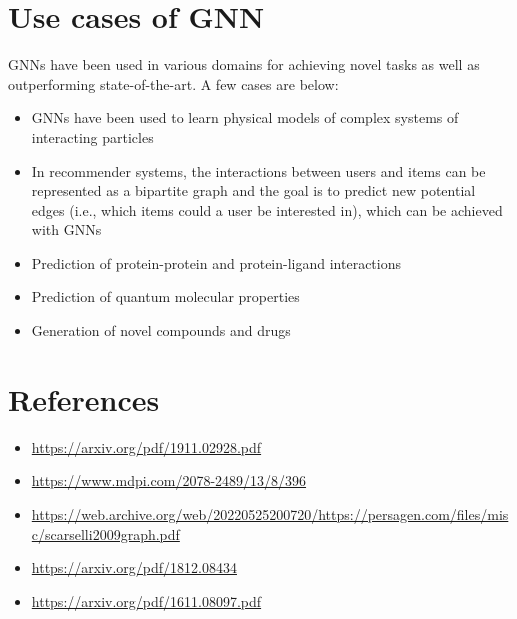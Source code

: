 \documentclass[
]{article}
\providecommand{\tightlist}{%
  \setlength{\itemsep}{0pt}\setlength{\parskip}{0pt}}
\begin{document}
\hypertarget{use-cases-of-gnn}{%
\section{Use cases of GNN}\label{use-cases-of-gnn}}

GNNs have been used in various domains for achieving novel tasks as well
as outperforming state-of-the-art. A few cases are below:

\begin{itemize}
\item
  GNNs have been used to learn physical models of complex systems of
  interacting particles
\item
  In recommender systems, the interactions between users and items can
  be represented as a bipartite graph and the goal is to predict new
  potential edges (i.e., which items could a user be interested in),
  which can be achieved with GNNs
\item
  Prediction of protein-protein and protein-ligand interactions
\item
  Prediction of quantum molecular properties
\item
  Generation of novel compounds and drugs
\end{itemize}

\hypertarget{references}{%
\section{References}\label{references}}

\begin{itemize}
\tightlist
\item
  \url{https://arxiv.org/pdf/1911.02928.pdf}
\item
  \url{https://www.mdpi.com/2078-2489/13/8/396}
\item
  \url{https://web.archive.org/web/20220525200720/https://persagen.com/files/misc/scarselli2009graph.pdf}
\item
  \url{https://arxiv.org/pdf/1812.08434}
\item
  \url{https://arxiv.org/pdf/1611.08097.pdf}
\end{itemize}

\printbibliography
\end{document}
